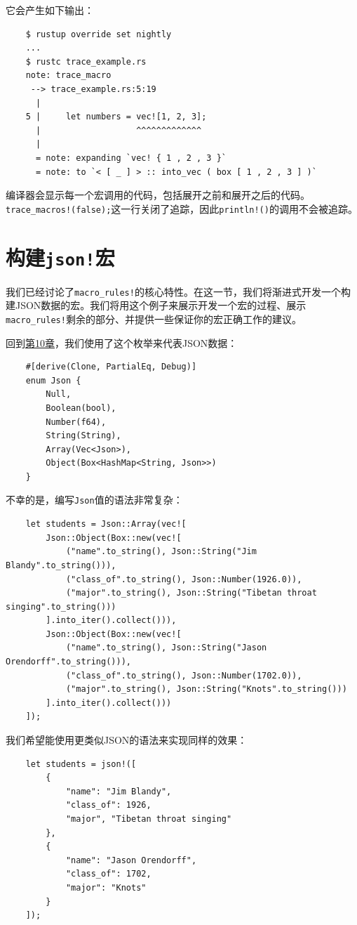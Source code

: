 它会产生如下输出：
\begin{verbatim}
    $ rustup override set nightly
    ...
    $ rustc trace_example.rs
    note: trace_macro
     --> trace_example.rs:5:19
      |
    5 |     let numbers = vec![1, 2, 3];
      |                   ^^^^^^^^^^^^^
      |
      = note: expanding `vec! { 1 , 2 , 3 }`
      = note: to `< [ _ ] > :: into_vec ( box [ 1 , 2 , 3 ] )`
\end{verbatim}
编译器会显示每一个宏调用的代码，包括展开之前和展开之后的代码。\texttt{trace\_macros!(false);}这一行关闭了追踪，因此\texttt{println!()}的调用不会被追踪。

\section{构建\texttt{json!}宏}

我们已经讨论了\texttt{macro\_rules!}的核心特性。在这一节，我们将渐进式开发一个构建JSON数据的宏。我们将用这个例子来展示开发一个宏的过程、展示\texttt{macro\_rules!}剩余的部分、并提供一些保证你的宏正确工作的建议。

回到\hyperref[ch10]{第10章}，我们使用了这个枚举来代表JSON数据：
\begin{verbatim}
    #[derive(Clone, PartialEq, Debug)]
    enum Json {
        Null,
        Boolean(bool),
        Number(f64),
        String(String),
        Array(Vec<Json>),
        Object(Box<HashMap<String, Json>>)
    }
\end{verbatim}

不幸的是，编写\texttt{Json}值的语法非常复杂：
\begin{verbatim}
    let students = Json::Array(vec![
        Json::Object(Box::new(vec![
            ("name".to_string(), Json::String("Jim Blandy".to_string())),
            ("class_of".to_string(), Json::Number(1926.0)),
            ("major".to_string(), Json::String("Tibetan throat singing".to_string()))
        ].into_iter().collect())),
        Json::Object(Box::new(vec![
            ("name".to_string(), Json::String("Jason Orendorff".to_string())),
            ("class_of".to_string(), Json::Number(1702.0)),
            ("major".to_string(), Json::String("Knots".to_string()))
        ].into_iter().collect()))
    ]);
\end{verbatim}

我们希望能使用更类似JSON的语法来实现同样的效果：
\begin{verbatim}
    let students = json!([
        {
            "name": "Jim Blandy",
            "class_of": 1926,
            "major", "Tibetan throat singing"
        },
        {
            "name": "Jason Orendorff",
            "class_of": 1702,
            "major": "Knots"
        }
    ]);
\end{verbatim}

